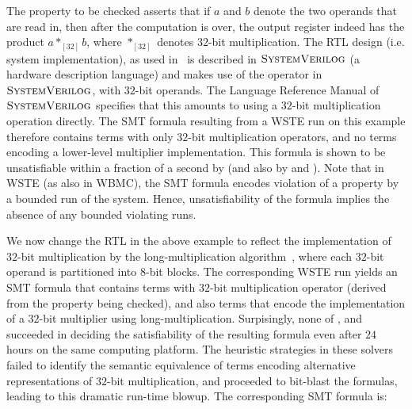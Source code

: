 The property to be checked asserts that if $a$ and $b$ denote the two
operands that are read in, then after the computation is over, the
output register indeed has the product $a *_{[32]} b$, where
$*_{[32]}$ denotes $32$-bit multiplication.  The RTL design
(i.e. system implementation), as used in~\cite{wste} is described in $\textsc{SystemVerilog}$
(a hardware description language) and makes use of the
{\tt *} operator in $\textsc{SystemVerilog}$, with $32$-bit operands.  The Language
Reference Manual of $\textsc{SystemVerilog}$ specifies that this amounts to using a
$32$-bit multiplication operation directly.  The SMT formula resulting
from a WSTE run on this example therefore contains terms with only
$32$-bit multiplication operators, and no terms encoding a lower-level
multiplier implementation.  This formula is shown to be unsatisfiable
within a fraction of a second by {\boolector} (and also by {\cvcfour}
and {\zthree}).  Note that in WSTE (as also in WBMC), the SMT formula
encodes violation of a property by a bounded run of the system. Hence,
unsatisfiability of the formula implies the absence of any bounded
violating runs.

We now change the RTL in the above example to reflect the
implementation of $32$-bit multiplication by the long-multiplication
algorithm~\cite{long}, where each $32$-bit operand is partitioned into
$8$-bit blocks.  The corresponding WSTE run yields an SMT formula that
contains terms with $32$-bit multiplication operator (derived from the
property being checked), and also terms that encode the implementation
of a $32$-bit multiplier using long-multiplication.  Surpisingly, none
of {\boolector}, {\cvcfour} and {\zthree} succeeded in deciding the
satisfiability of the resulting formula even after $24$ hours on the
same computing platform.  The heuristic strategies in these solvers
failed to identify the semantic equivalence of terms encoding
alternative representations of $32$-bit multiplication, and proceeded
to bit-blast the formulas, leading to this dramatic run-time blowup. The corresponding SMT formula is:


